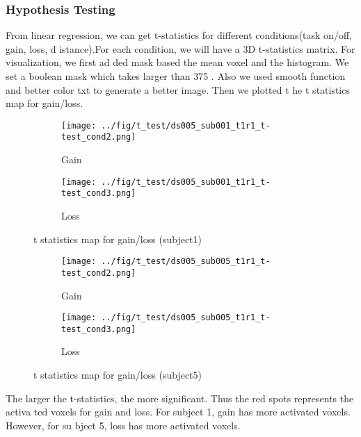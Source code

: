 \subsubsection {Hypothesis Testing}
From linear regression, we can get t-statistics for different conditions(task on/off, gain, loss, d
istance).For each condition, we will have a 3D t-statistics matrix. For visualization, we first ad
ded mask based the mean voxel and the histogram. We set a boolean mask which takes larger than 375
. Also we used smooth function and better color txt to generate a better image. Then we plotted t
he t statistics map for gain/loss. 
\begin{figure}[H]
\begin{subfigure}{.5\textwidth}
  \centering
  \texttt{[image: ../fig/t\_test/ds005\_sub001\_t1r1\_t-test\_cond2.png]}
  \caption{Gain}
  \label{fig:sfig1}
\end{subfigure}%
\begin{subfigure}{.5\textwidth}
  \centering
  \texttt{[image: ../fig/t\_test/ds005\_sub001\_t1r1\_t-test\_cond3.png]}
  \caption{Loss}
  \label{fig:sfig2}
\end{subfigure}
\caption{t statistics map for gain/loss (subject1)}
\label{fig:fig}
\end{figure}

\begin{figure}[H]
\begin{subfigure}{.5\textwidth}
  \centering
  \texttt{[image: ../fig/t\_test/ds005\_sub005\_t1r1\_t-test\_cond2.png]}
  \caption{Gain}
  \label{fig:sfig1}
\end{subfigure}%
\begin{subfigure}{.5\textwidth}
  \centering
  \texttt{[image: ../fig/t\_test/ds005\_sub005\_t1r1\_t-test\_cond3.png]}
  \caption{Loss}
  \label{fig:sfig2}
\end{subfigure}
\caption{t statistics map for gain/loss (subject5)}
\label{fig:fig}
\end{figure}
\noindent
The larger the t-statistics, the more significant. Thus the red spots represents the activa
ted voxels for gain and loss. For subject 1, gain has more activated voxels. However, for su
bject 5, loss has more activated voxels.

